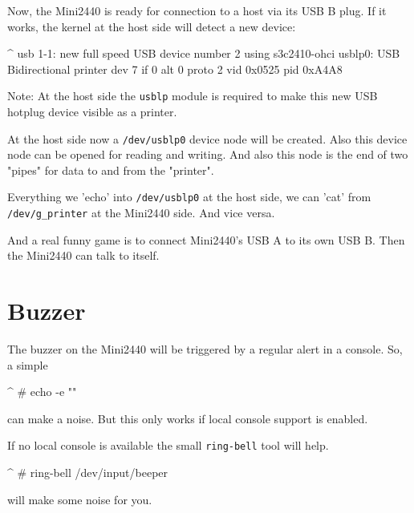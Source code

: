 Now, the Mini2440 is ready for connection to a host via its USB B plug.
If it works, the kernel at the host side will detect a new device:

\begin{ptxshell}[escapechar=|]{^}
usb 1-1: new full speed USB device number 2 using s3c2410-ohci
usblp0: USB Bidirectional printer dev 7 if 0 alt 0 proto 2 vid 0x0525 pid 0xA4A8
\end{ptxshell}

Note: At the host side the \texttt{usblp} module is required to make this new
USB hotplug device visible as a printer.

At the host side now a \texttt{/dev/usblp0} device node will be created. Also
this device node can be opened for reading and writing. And also this node is
the end of two "pipes" for data to and from the "printer".

Everything we 'echo' into \texttt{/dev/usblp0} at the host side, we can 'cat'
from \texttt{/dev/g\_printer} at the Mini2440 side. And vice versa.

And a real funny game is to connect Mini2440's USB A to its own USB B. Then
the Mini2440 can talk to itself.


\section{Buzzer}					\label{sec:Buzzer}

The buzzer on the Mini2440 will be triggered by a regular alert in a console.
So, a simple

\begin{ptxshell}[escapechar=|]{^}
# echo -e "\a"
\end{ptxshell}

can make a noise. But this only works if local console support is enabled.

If no local console is available the small \texttt{ring-bell} tool will help.

\begin{ptxshell}[escapechar=|]{^}
# ring-bell /dev/input/beeper
\end{ptxshell}

will make some noise for you.

%
%
%

